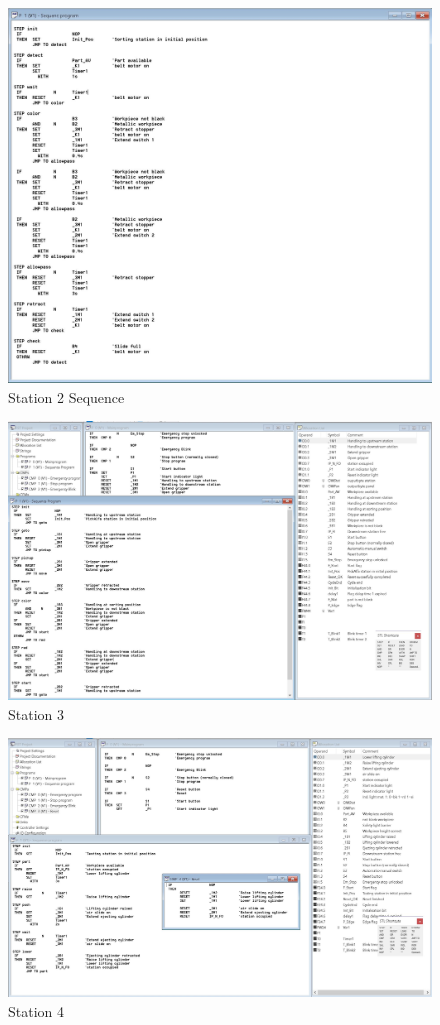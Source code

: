 \documentclass[a4paper, 10pt,  conference]{article}
\begin{document}
\begin{figure}[h!]
  \includegraphics[width=\linewidth]{images/21}
  \caption{Station 2 Sequence}
  \label{fig:Station 2}
\end{figure}

\begin{figure}[h!]
  \includegraphics[width=\linewidth]{images/3}
  \caption{Station 3}
  \label{fig:Station 3}
\end{figure}

\begin{figure}[h!]
  \includegraphics[width=\linewidth]{images/4}
  \caption{Station 4}
  \label{fig:Station 4}
\end{figure}
\end{document}

